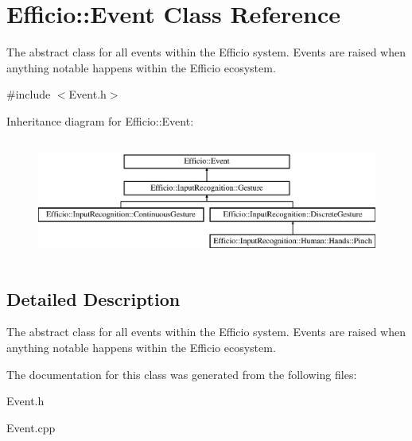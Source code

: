 \hypertarget{class_efficio_1_1_event}{}\section{Efficio\+:\+:Event Class Reference}
\label{class_efficio_1_1_event}


The abstract class for all events within the Efficio system. Events are raised when anything notable happens within the Efficio ecosystem.  




{\ttfamily \#include $<$Event.\+h$>$}

Inheritance diagram for Efficio\+:\+:Event\+:\begin{figure}[H]
\begin{center}
\leavevmode
\includegraphics[height=4.000000cm]{class_efficio_1_1_event}
\end{center}
\end{figure}


\subsection{Detailed Description}
The abstract class for all events within the Efficio system. Events are raised when anything notable happens within the Efficio ecosystem. 

The documentation for this class was generated from the following files\+:\begin{DoxyCompactItemize}
\item 
Event.\+h\item 
Event.\+cpp\end{DoxyCompactItemize}
